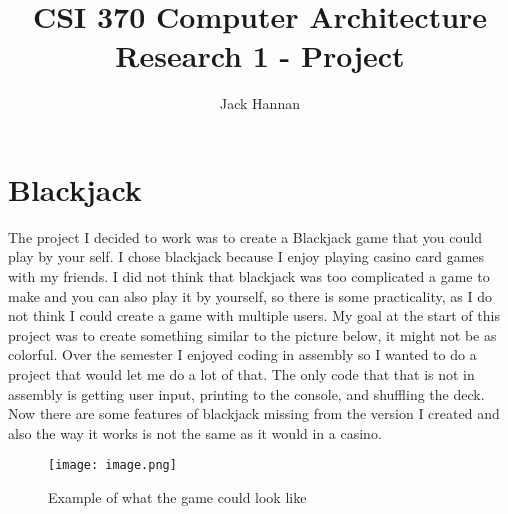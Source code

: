 \documentclass[twoside]{article}
\date{}
\begin{document}
\title{CSI 370 Computer Architecture \\ Research 1 - Project}
\author{Jack Hannan}
\maketitle
\renewcommand{\labelitemi}{$\diamond$}
\section{\textbf{Blackjack}}

The project I decided to work was to create a Blackjack game that you could play by your self. I chose blackjack because I enjoy playing casino card games with my friends. I did not think that blackjack was too complicated a game to make and you can also play it by yourself, so there is some practicality, as I do not think I could create a game with multiple users. My goal at the start of this project was to create something similar to the picture below, it might not be as colorful.   Over the semester I enjoyed coding in assembly so I wanted to do a project that would let me do a lot of that. The only code that that is not in assembly is getting user input, printing to the console, and shuffling the deck. Now there are some features of blackjack missing from the version I created and also the way it works is not the same as it would in a casino.
\begin{figure}[htbp]
    \centering
    \texttt{[image: image.png]}
    \caption{Example of what the game could look like}
    \label{Example}
\end{figure}
\end{document}
